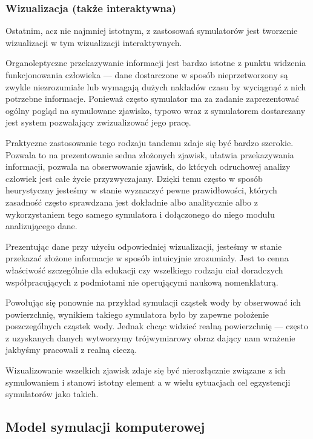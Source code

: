 \subsubsection{Wizualizacja (także interaktywna)}
\par{
Ostatnim, acz nie najmniej istotnym, z zastosowań symulatorów jest tworzenie wizualizacji w tym wizualizacji interaktywnych.
}
\par{
Organoleptyczne przekazywanie informacji jest bardzo istotne z punktu widzenia funkcjonowania człowieka --- dane dostarczone w sposób nieprzetworzony są zwykle niezrozumiałe lub wymagają dużych nakładów czasu by wyciągnąć z nich potrzebne informacje. Ponieważ często symulator ma za zadanie zaprezentować ogólny pogląd na symulowane zjawisko, typowo wraz z symulatorem dostarczany jest system pozwalający zwizualizować jego pracę.
}
\par{
Praktyczne zastosowanie tego rodzaju tandemu zdaje się być bardzo szerokie. Pozwala to na prezentowanie sedna złożonych zjawisk, ułatwia przekazywania informacji, pozwala na obserwowanie zjawisk, do których odruchowej analizy człowiek jest całe życie przyzwyczajany. Dzięki temu często w sposób heurystyczny jesteśmy w stanie wyznaczyć pewne prawidłowości, których zasadność często sprawdzana jest dokładnie albo analitycznie albo z wykorzystaniem tego samego symulatora i dołączonego do niego modułu analizującego dane.
}
\par{
Prezentując dane przy użyciu odpowiedniej wizualizacji, jesteśmy w stanie przekazać złożone informacje w sposób intuicyjnie zrozumiały. Jest to cenna właściwość szczególnie dla edukacji czy wszelkiego rodzaju ciał doradczych współpracujących z podmiotami nie operującymi naukową nomenklaturą.
}
\par{
Powołując się ponownie na przykład symulacji cząstek wody by obserwować ich powierzchnię, wynikiem takiego symulatora było by zapewne położenie poszczególnych cząstek wody. Jednak chcąc widzieć realną powierzchnię --- często z uzyskanych danych wytworzymy trójwymiarowy obraz dający nam wrażenie jakbyśmy pracowali z realną cieczą.
}
\par{
Wizualizowanie wszelkich zjawisk zdaje się być nierozłącznie związane z ich symulowaniem i stanowi istotny element a w wielu sytuacjach cel egzystencji symulatorów jako takich.
}

\subsection{Model symulacji komputerowej}
